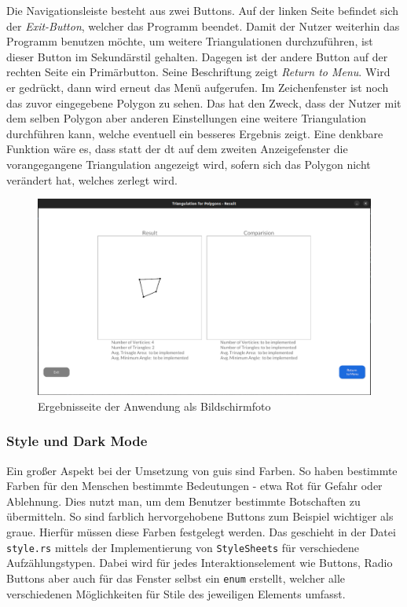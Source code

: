 Die Navigationsleiste besteht aus zwei Buttons. Auf der linken Seite befindet sich der \emph{Exit-Button}, welcher das Programm beendet. Damit der Nutzer weiterhin das Programm benutzen möchte, um weitere Triangulationen durchzuführen,
ist dieser Button im Sekundärstil gehalten.
Dagegen ist der andere Button auf der rechten Seite ein Primärbutton. Seine Beschriftung zeigt \emph{Return to Menu}. Wird er gedrückt, dann wird erneut das Menü aufgerufen. Im Zeichenfenster ist noch das zuvor eingegebene Polygon zu sehen.
Das hat den Zweck, dass der Nutzer mit dem selben Polygon aber anderen Einstellungen eine weitere Triangulation durchführen kann, welche eventuell ein besseres Ergebnis zeigt.
Eine denkbare Funktion wäre es, dass statt der \ac{dt} auf dem zweiten Anzeigefenster die vorangegangene Triangulation angezeigt wird, sofern sich das Polygon nicht verändert hat, welches zerlegt wird.

\begin{figure}[h]
    \centering
    \includegraphics[width=1\textwidth]{bilder/result.png}
    \caption[Ergebnisseite der Anwendung]{Ergebnisseite der Anwendung als Bildschirmfoto}
\end{figure}


\subsubsection{Style und Dark Mode}
Ein großer Aspekt bei der Umsetzung von \ac{gui}s sind Farben. So haben bestimmte Farben für den Menschen bestimmte Bedeutungen - etwa Rot für Gefahr oder Ablehnung.
Dies nutzt man, um dem Benutzer bestimmte Botschaften zu übermitteln. So sind farblich hervorgehobene Buttons zum Beispiel wichtiger als graue. Hierfür müssen diese Farben festgelegt werden.
Das geschieht in der Datei \lstinline{style.rs} mittels der Implementierung von \lstinline{StyleSheets} für verschiedene Aufzählungstypen.
Dabei wird für jedes Interaktionselement wie Buttons, Radio Buttons aber auch für das Fenster selbst ein \lstinline{enum} erstellt, welcher alle verschiedenen Möglichkeiten für Stile des jeweiligen Elements 
umfasst. 

